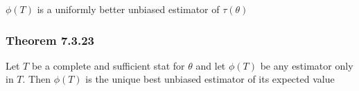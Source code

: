 			\(\phi(T)\) is a uniformly better unbiased estimator of \(\tau(\theta)\)
			
		\subsubsection{Theorem 7.3.23}
			Let \(T\) be a complete and sufficient stat for \(\theta\)
			and let \(\phi(T)\) be any estimator only in \(T\).
			Then \(\phi(T)\) is the unique best unbiased estimator of its expected value
			
			
			
			
			
		